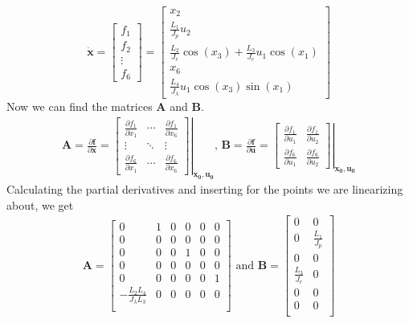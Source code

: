 \begin{equation*}
    \mathbf{\dot{x}} = 
    \begin{bmatrix}
        f_1 \\ f_2 \\ \vdots \\ f_6
    \end{bmatrix}
    =
    \begin{bmatrix}
        x_2 \\ \frac{L_1}{J_p}u_2 \\ \frac{L_2}{J_e}\cos(x_3) + \frac{L_3}{J_e} u_1 \cos(x_1) \\ x_6 \\ \frac{L_4}{J_\lambda}u_1 \cos(x_3) \sin(x_1)
    \end{bmatrix}
\end{equation*}
Now we can find the matrices \textbf{A} and \textbf{B}.
\begin{gather*}
    \mathbf{A} = \frac{\partial \mathbf{f}}{\partial \mathbf{x}} = 
    \left.
    \begin{bmatrix}
        \frac{\partial f_1}{\partial x_1} & \cdots &\frac{\partial f_1}{\partial x_6} \\
        \vdots & \ddots & \vdots \\
        \frac{\partial f_6}{\partial x_1} & \cdots & \frac{\partial f_6}{\partial x_6}
    \end{bmatrix}
    \right|_{\mathbf{x_0}, \mathbf{u_0}}
    \text{, }
    \mathbf{B} = \frac{\partial \mathbf{f}}{\partial \mathbf{u}} = 
    \left.
    \begin{bmatrix}
        \frac{\partial f_1}{\partial u_1} & \frac{\partial f_1}{\partial u_2} \\
        \frac{\partial f_6}{\partial u_1} & \frac{\partial f_6}{\partial u_2}
    \end{bmatrix}
    \right|_{\mathbf{x_0}, \mathbf{u_0}}
\end{gather*}
Calculating the partial derivatives and inserting for the points we are linearizing about, we get
\begin{gather}
    \mathbf{A} = 
    \begin{bmatrix}
        0 & 1 & 0 & 0 & 0 & 0 \\
        0 & 0 & 0 & 0 & 0 & 0 \\
        0 & 0 & 0 & 1 & 0 & 0 \\
        0 & 0 & 0 & 0 & 0 & 0 \\
        0 & 0 & 0 & 0 & 0 & 1 \\
        -\frac{L_2 L_4}{J_\lambda L_3} & 0 & 0 & 0 & 0 & 0 \\
    \end{bmatrix}
    \text{ and }
    \mathbf{B} =
    \begin{bmatrix}
        0 & 0 \\
        0 & \frac{L_1}{J_p} \\
        0 & 0 \\
        \frac{L_3}{J_e} & 0\\
        0 & 0 \\
        0 & 0 \\
    \end{bmatrix}
\end{gather}
